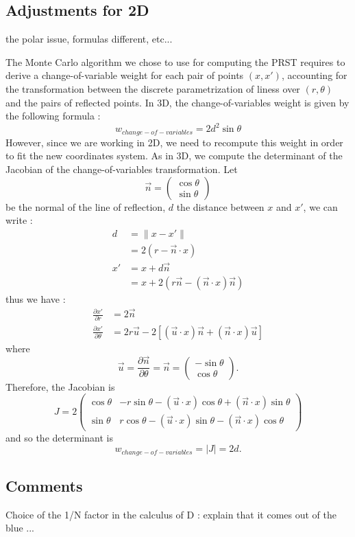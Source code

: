 \documentclass[10pt,a4paper]{article}			%
\begin{document}
	\subsection{Adjustments for 2D}
	
	the polar issue, formulas different, etc...

The Monte Carlo algorithm we chose to use for computing the PRST requires to derive a change-of-variable weight for each pair of points $(x,x')$, accounting for the transformation between the discrete parametrization of liness over $(r,\theta)$ and the pairs of reflected points. In 3D, the change-of-variables weight is given by the following formula :
\[w_{change-of-variables} = 2d^2\sin\theta\]
However, since we are working in 2D, we need to recompute this weight in order to fit the new coordinates system. As in 3D, we compute the determinant of the Jacobian of the change-of-variables transformation. Let 
\[\vec{n}=\begin{pmatrix}\cos\theta \\ \sin\theta\end{pmatrix}\]
be the normal of the line of reflection, $d$ the distance between $x$ and $x'$, we can write :
\begin{align*}
 d & = \lVert x-x' \rVert  \\
& = 2(r-\vec{n}\cdot x) \\
x' &= x+ d\vec{n}\\
&= x+ 2(r\vec{n} - (\vec{n}\cdot x)\vec{n})
\end{align*}
thus we have :
\begin{align*}
\frac{\partial x'}{\partial r}&=2\vec{n}\\
\frac{\partial x'}{\partial \theta}&= 2r\vec{u}-2[(\vec{u}\cdot x)\vec{n}+(\vec{n}\cdot x)\vec{u}]
\end{align*}
where 
\[\vec{u}=\frac{\partial \vec{n}}{\partial \theta} = \vec{n}=\begin{pmatrix}-\sin\theta \\ \cos\theta\end{pmatrix}.\]
Therefore, the Jacobian is
\[J = 2
\begin{pmatrix}
\cos\theta & -r\sin\theta-(\vec{u}\cdot x)\cos\theta+(\vec{n}\cdot x)\sin\theta\\
\sin\theta &  r \cos\theta - (\vec{u}\cdot x)\sin\theta - (\vec{n}\cdot x)\cos\theta
\end{pmatrix}\]
and so the determinant is
\[w_{change-of-variables} = |J| = 2d.\]

  	\subsection{Comments}
  	Choice of the 1/N factor in the calculus of D : explain that it comes out of the blue ... \\
  	
\end{document}
